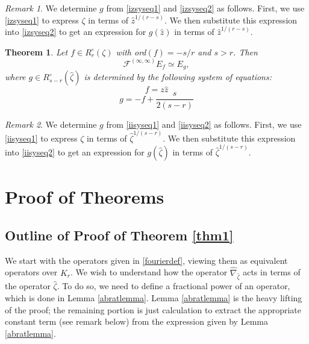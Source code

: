 \documentclass[11pt]{amsart}
\theoremstyle{theorem}
\newtheorem{theorem}{Theorem}[section]
\theoremstyle{lemma}
\theoremstyle{corollary}
\theoremstyle{proposition}
\theoremstyle{definition}
\theoremstyle{remark}
\newtheorem*{remark}{Remark}
\def\z{\hat{\zeta}}
\begin{document}
\begin{remark}
We determine $g$ from \eqref{izsyseq1} and \eqref{izsyseq2} as follows.  First, we use \eqref{izsyseq1} to express $\zeta$ in terms of $\hat{z}^{1/(r-s)}$.  We then substitute this expression into \eqref{izsyseq2} to get an expression for $g(\hat{z})$ in terms of $\hat{z}^{1/(r-s)}$.
\end{remark}

\begin{theorem}\label{thm3}
    Let $f\in  R^{\circ}_r(\zeta)$ with ord$(f)=-s/r$ and $s>r$. Then
\[\mathcal{F}^{(\infty, \infty)}E_{f}\simeq E_{g},\]
where $g\in R^{\circ}_{s-r}(\z)$ is determined by the following system of equations:
\begin{equation}\label{iisyseq1}f=z\hat{z}
\end{equation}
\begin{equation}\label{iisyseq2} g=-f+\frac{s}{2(s-r)}
\end{equation}

\end{theorem}

\begin{remark}
  We determine $g$ from \eqref{iisyseq1} and \eqref{iisyseq2} as follows.  First, we use \eqref{iisyseq1} to express $\zeta$ in terms of $\z^{1/(s-r)}$.  We then substitute this expression into \eqref{iisyseq2} to get an expression for $g(\z)$ in terms of $\z^{1/(s-r)}$.
\end{remark}

\section{Proof of Theorems}

\subsection{Outline of Proof of Theorem \ref{thm1}} We start with the operators given in \eqref{fourierdef}, viewing them as equivalent operators over $K_r$.  We wish to understand how the operator $\hat{\nabla}_{\z}$ acts in terms of the operator $\z$.  To do so, we need to define a fractional power of an operator, which is done in Lemma \ref{abratlemma}.  Lemma \ref{abratlemma} is the heavy lifting of the proof; the remaining portion is just calculation to extract the appropriate constant term (see remark below) from the expression given by Lemma \ref{abratlemma}.
\end{document}
